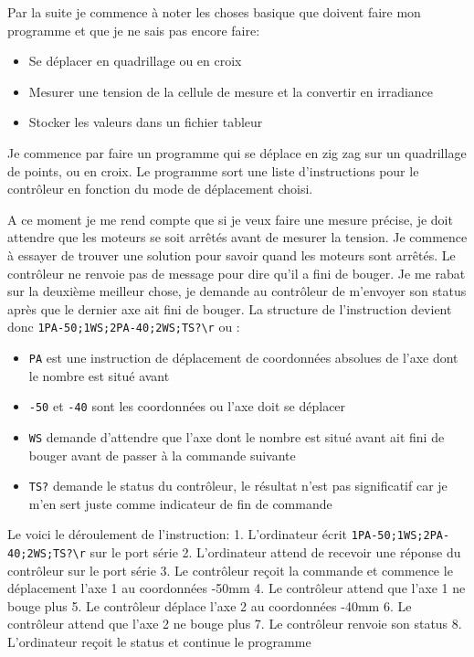 \documentclass[12pt]{article}
\begin{document}
Par la suite je commence à noter les choses basique que doivent faire mon programme et que je ne sais pas encore faire:
\begin{itemize}
	\item Se déplacer en quadrillage ou en croix
	\item Mesurer une tension de la cellule de mesure et la convertir en irradiance
	\item Stocker les valeurs dans un fichier tableur
\end{itemize}

Je commence par faire un programme qui se déplace en zig zag sur un quadrillage de points, ou en croix.
Le programme sort une liste d'instructions pour le contrôleur en fonction du mode de déplacement choisi.

A ce moment je me rend compte que si je veux faire une mesure précise, je doit attendre que les moteurs se soit arrêtés avant de mesurer la tension.
Je commence à essayer de trouver une solution pour savoir quand les moteurs sont arrêtés.
Le contrôleur ne renvoie pas de message pour dire qu'il a fini de bouger.
Je me rabat sur la deuxième meilleur chose, je demande au contrôleur de m'envoyer son status après que le dernier axe ait fini de bouger.
La structure de l'instruction devient donc \verb|1PA-50;1WS;2PA-40;2WS;TS?\r| ou :
\begin{itemize}
	\item \verb|PA| est une instruction de déplacement de coordonnées absolues de l'axe dont le nombre est situé avant
	\item \verb|-50| et \verb|-40| sont les coordonnées ou l'axe doit se déplacer
	\item \verb|WS| demande d'attendre que l'axe dont le nombre est situé avant ait fini de bouger avant de passer à la commande suivante
	\item \verb|TS?| demande le status du contrôleur, le résultat n'est pas significatif car je m'en sert juste comme indicateur de fin de commande
\end{itemize}
Le voici le déroulement de l'instruction:
1. L'ordinateur écrit \verb|1PA-50;1WS;2PA-40;2WS;TS?\r| sur le port série
2. L'ordinateur attend de recevoir une réponse du contrôleur sur le port série
3. Le contrôleur reçoit la commande et commence le déplacement l'axe 1 au coordonnées -50mm
4. Le contrôleur attend que l'axe 1 ne bouge plus
5. Le contrôleur déplace l'axe 2 au coordonnées -40mm
6. Le contrôleur attend que l'axe 2 ne bouge plus
7. Le contrôleur renvoie son status
8. L'ordinateur reçoit le status et continue le programme
\end{document}
